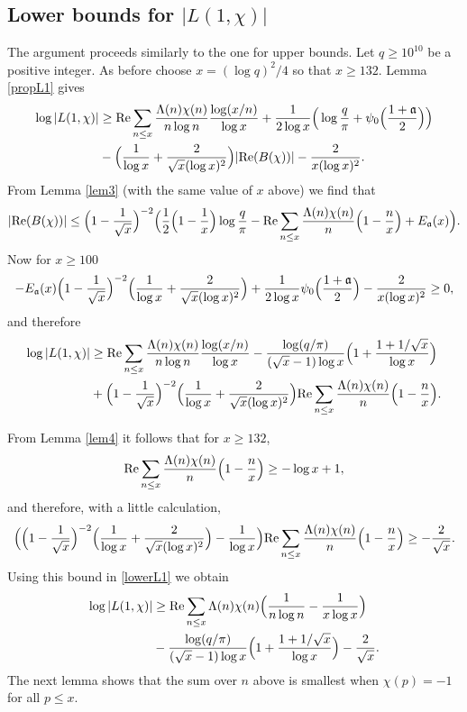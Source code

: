 \documentclass [12pt]{amsart}
\numberwithin{equation}{section}
\newcommand{\tRe}{\textup{Re}}
\begin{document}
\subsection{Lower bounds for $|L(1,\chi)|$}  
The argument proceeds similarly to the one for upper bounds.  Let $q\geq 10^{10}$ be a positive integer. As before  choose $x=(\log q)^2/4$ so  that $x\geq 132$.
  Lemma \ref{propL1} gives
  \begin{align*}
\log |L(1,\chi)|& \ge \tRe \sum_{n\le x} \frac{\Lambda(n)\chi(n)}{n\log n} \frac{\log (x/n)}{\log x} 
+ \frac 1{2\log x} \Big( \log \frac{q}{\pi } +\psi_0 \Big(\frac{1+\frak a}{2}\Big)\Big) \\
&- \Big( \frac{1}{\log x} + \frac{2}{\sqrt{x}(\log x)^2}\Big) | \tRe (B(\chi))| - \frac{2}{x(\log x)^2}. 
\end{align*}
From Lemma \ref{lem3} (with the same value of $x$ above) we find 
that 
$$ 
|\tRe (B(\chi))| \le \Big(1-\frac{1}{\sqrt{x}}\Big)^{-2} \Big( \frac 12\Big(1-\frac 1x\Big) \log\frac{q}{\pi} 
- \tRe \sum_{n\le x} \frac{\Lambda(n)\chi(n)}{n} \Big(1-\frac nx\Big) + E_{\frak a}(x)\Big). 
$$ 
Now for $x\ge 100$ 
$$ 
-E_{\frak a}(x) \Big(1-\frac 1{\sqrt{x}}\Big)^{-2} 
\Big(\frac{1}{\log x}+\frac{2}{\sqrt{x}(\log x)^2} \Big) + \frac{1}{2\log x}\psi_0\Big(\frac{1+\frak a}{2}\Big) -\frac{2}{x(\log x)^2} \ge 0, 
$$ 
and therefore  
\begin{align}\label{lowerL1}
 \log |L(1,\chi)| &\ge \tRe \sum_{n\le x} 
\frac{\Lambda(n)\chi(n)}{n\log n} \frac{\log (x/n)}{\log x} 
- \frac{\log (q/\pi)}{(\sqrt{x}-1)\log x} \Big(1+\frac{1+1/\sqrt{x}}{\log x}\Big) \nonumber \\
&+ \Big(1-\frac 1{\sqrt{x}}\Big)^{-2} \Big(\frac 1{\log x}+\frac{2}{\sqrt{x}(\log x)^2} 
\Big) \tRe \sum_{n\le x}\frac{\Lambda(n)\chi(n)}{n} \Big(1-\frac nx\Big). 
\end{align}
 
From Lemma \ref{lem4} it follows that for $x\ge 132$,
$$
\tRe\sum_{n\le x}\frac{\Lambda(n)\chi(n)}{n} \Big(1-\frac nx\Big)\geq -\log x+1,
$$
and therefore, with a little calculation, 
$$ 
\Big( \Big( 1-\frac{1}{\sqrt{x}}\Big)^{-2} \Big(\frac{1}{\log x}+\frac{2}{\sqrt{x}(\log x)^2}\Big) - 
\frac{1}{\log x} \Big) \tRe \sum_{n\le x} \frac{\Lambda(n)\chi(n)}{n} \Big(1-\frac nx\Big) 
\ge - \frac{2}{\sqrt{x}}.
$$
Using this bound in \eqref{lowerL1}  we obtain 
\begin{align}
\label{eqn5.2}
\log |L(1,\chi)| &\ge \tRe\sum_{n\le x} \Lambda(n) \chi(n) 
\Big(\frac{1}{n\log n} -\frac{1}{x\log x} \Big) \nonumber \\
&- \frac{\log (q/\pi)}{(\sqrt{x}-1)\log x} 
\Big(1+\frac{1+1/\sqrt{x}}{\log x}\Big) -\frac{2}{\sqrt{x}}. 
\end{align}
The next lemma shows that the sum over $n$ above is smallest 
when $\chi(p)=-1$ for all $p\le x$.  
\end{document}

